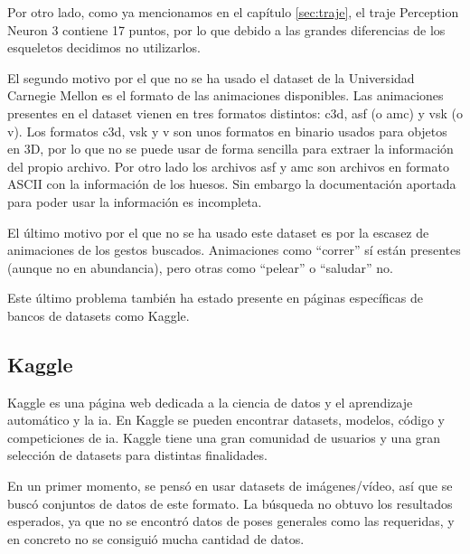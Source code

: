 Por otro lado, como ya mencionamos en el capítulo \ref{sec:traje}, el traje Perception Neuron 3 contiene 17 puntos, por lo que debido a las grandes diferencias de los esqueletos decidimos no utilizarlos.

El segundo motivo por el que no se ha usado el dataset de la Universidad Carnegie Mellon es el formato de las animaciones disponibles.
Las animaciones presentes en el dataset vienen en tres formatos distintos: c3d, asf (o amc) y vsk (o v).
Los formatos c3d, vsk y v son unos formatos en binario usados para objetos en 3D, por lo que no se puede usar de forma sencilla para extraer la información del propio archivo.
Por otro lado los archivos asf y amc son archivos en formato ASCII con la información de los huesos. Sin embargo la documentación aportada para poder usar la información es incompleta.

El último motivo por el que no se ha usado este dataset es por la escasez de animaciones de los gestos buscados.
Animaciones como ``correr'' sí están presentes (aunque no en abundancia), pero otras como ``pelear'' o ``saludar'' no.

Este último problema también ha estado presente en páginas específicas de bancos de datasets como Kaggle.

\subsection{Kaggle}

Kaggle es una página web dedicada a la ciencia de datos y el aprendizaje automático y la \gls{ia}. En Kaggle se pueden encontrar datasets, modelos, código y competiciones de \gls{ia}. Kaggle tiene una gran comunidad de usuarios y una gran selección de datasets para distintas finalidades.

En un primer momento, se pensó en usar datasets de imágenes/vídeo, así que se buscó conjuntos de datos de este formato. La búsqueda no obtuvo los resultados esperados, ya que no se encontró datos de poses generales como las requeridas, y en concreto no se consiguió mucha cantidad de datos.

